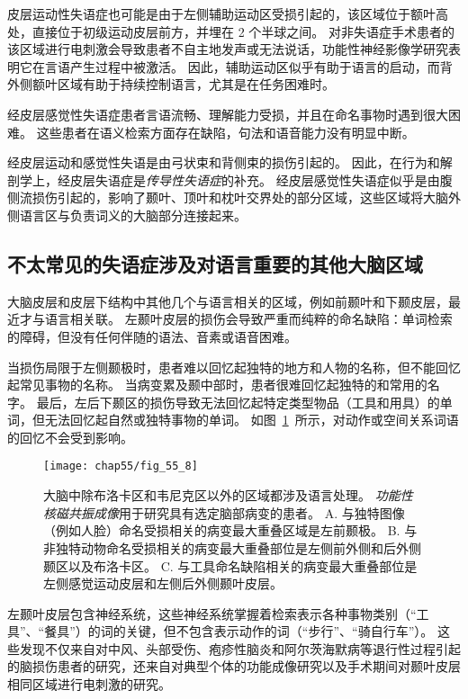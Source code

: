 皮层运动性失语症也可能是由于左侧辅助运动区受损引起的，该区域位于额叶高处，直接位于初级运动皮层前方，并埋在 2 个半球之间。
对非失语症手术患者的该区域进行电刺激会导致患者不自主地发声或无法说话，功能性神经影像学研究表明它在言语产生过程中被激活。
因此，辅助运动区似乎有助于语言的启动，而背外侧额叶区域有助于持续控制语言，尤其是在任务困难时。


经皮层感觉性失语症患者言语流畅、理解能力受损，并且在命名事物时遇到很大困难。
这些患者在语义检索方面存在缺陷，句法和语音能力没有明显中断。


经皮层运动和感觉性失语是由弓状束和背侧束的损伤引起的。
因此，在行为和解剖学上，经皮层失语症是\textit{传导性失语症}的补充。
经皮层感觉性失语症似乎是由腹侧流损伤引起的，影响了颞叶、顶叶和枕叶交界处的部分区域，这些区域将大脑外侧语言区与负责词义的大脑部分连接起来。



\subsection{不太常见的失语症涉及对语言重要的其他大脑区域}

大脑皮层和皮层下结构中其他几个与语言相关的区域，例如前颞叶和下颞皮层，最近才与语言相关联。
左颞叶皮层的损伤会导致严重而纯粹的命名缺陷：单词检索的障碍，但没有任何伴随的语法、音素或语音困难。


当损伤局限于左侧颞极时，患者难以回忆起独特的地方和人物的名称，但不能回忆起常见事物的名称。
当病变累及颞中部时，患者很难回忆起独特的和常用的名字。
最后，左后下颞区的损伤导致无法回忆起特定类型物品（工具和用具）的单词，但无法回忆起自然或独特事物的单词。
如图~\ref{fig:55_8}~所示，对动作或空间关系词语的回忆不会受到影响。


\begin{figure}[htbp]
	\centering
	\texttt{[image: chap55/fig\_55\_8]}
	\caption{大脑中除布洛卡区和韦尼克区以外的区域都涉及语言处理。
		\textit{功能性核磁共振成像}用于研究具有选定脑部病变的患者。
		A. 与独特图像（例如人脸）命名受损相关的病变最大重叠区域是左前颞极。
		B. 与非独特动物命名受损相关的病变最大重叠部位是左侧前外侧和后外侧颞区以及布洛卡区。
		C. 与工具命名缺陷相关的病变最大重叠部位是左侧感觉运动皮层和左侧后外侧颞叶皮层。}
	\label{fig:55_8}
\end{figure}


左颞叶皮层包含神经系统，这些神经系统掌握着检索表示各种事物类别（“工具”、“餐具”）的词的关键，但不包含表示动作的词（“步行”、“骑自行车”）。
这些发现不仅来自对中风、头部受伤、疱疹性脑炎和阿尔茨海默病等退行性过程引起的脑损伤患者的研究，还来自对典型个体的功能成像研究以及手术期间对颞叶皮层相同区域进行电刺激的研究。


